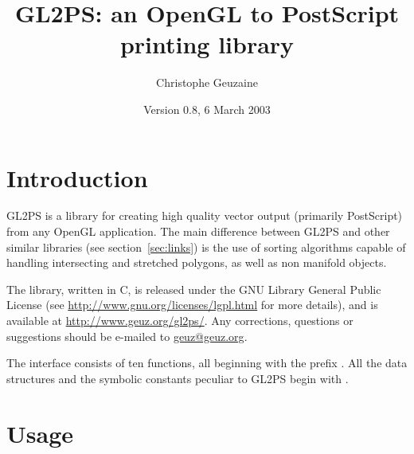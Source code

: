 \documentclass[10pt]{article}
\newcommand{\dd}{\begingroup\Url}
\newcommand{\email}[2]{\href{mailto:#2}{#1}}
\begin{document}
\title{GL2PS: an OpenGL to PostScript printing library}
\author{Christophe Geuzaine}
\date{Version 0.8, 6 March 2003}

\maketitle


\tableofcontents

\section{Introduction}

GL2PS is a library for creating high quality vector output (primarily
PostScript) from any OpenGL application. The main difference between GL2PS
and other similar libraries (see section~\ref{sec:links}) is the use of
sorting algorithms capable of handling intersecting and stretched polygons,
as well as non manifold objects.

The library, written in C, is released under the GNU Library General Public
License (see \url{http://www.gnu.org/licenses/lgpl.html} for more details),
and is available at \url{http://www.geuz.org/gl2ps/}. Any corrections,
questions or suggestions should be e-mailed to
\email{geuz@geuz.org}{geuz@geuz.org}.

The interface consists of ten functions, all beginning with the prefix
\dd{gl2ps}. All the data structures and the symbolic constants peculiar to
GL2PS begin with \dd{GL2PS}.


\section{Usage}

\end{document}
